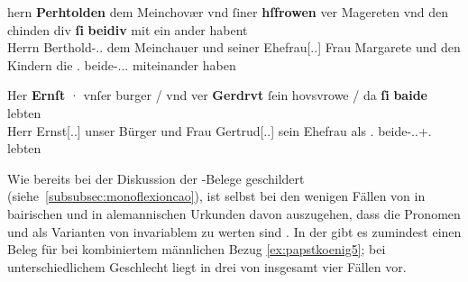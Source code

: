 \begin{exe}
\ex \label{ex:m+f_si_beide_iu}
	\begin{xlist}
	\ex \label{ex:m+f_si_beidiu}
		\gll hern \textbf{Perhtolden} dem Meinchovær vnd ſiner \textbf{hſfrowen} ver
				Magereten vnd den chinden div \textbf{ſi} \textbf{beidiv} {mit
				ein ander} habent \\
			Herrn Berthold-\Dat.\Sg.\MascM{} dem Meinchauer und seiner
				Ehefrau[\Dat.\Sg.\FemF] Frau Margarete und den Kindern die
				\Tpl\subMF.\Nom{} beide-\Nom.\Pl.\NeutMF.\St{} miteinander
				haben \\
		\begin{taggedline}{\parencites(Regensburg, 1287)[\pno~937, 292.40--41]{cao2}}
		\trans {}
		\end{taggedline}

	\ex \label{ex:m+f_si_beide}
		\gll Her \textbf{Ernſt} · vnſer burger / vnd ver \textbf{Gerdrvt} ſein
				hovsvrowe / da \textbf{ſi} \textbf{baide} lebten \\
			Herr Ernst[\Nom.\Sg.\MascM] {} unser Bürger {} und Frau
				Gertrud[\Nom.\Sg.\FemF] sein Ehefrau {} als \Tpl\subMF.\Nom{}
				beide-\Nom.\Pl.\M+\F\subMF.\St{} lebten \\
		\begin{taggedline}{\parencites(Wien, 1289)[\pno~1073, 374.40--41]{cao2}}
		\trans {}
		\end{taggedline}
	\end{xlist}
\end{exe}

Wie bereits bei der Diskussion der \CAO{}-Belege geschildert
(siehe~\cref{subsubsec:monoflexioncao}), ist selbst bei den wenigen Fällen von
 in bairischen und  in alemannischen Urkunden
davon auszugehen, dass die Pronomen  und  als Varianten von
invariablem  zu werten sind \autocite[vgl.][394--396]{ksw2}. In der
\citet{kc} gibt es zumindest einen Beleg für  bei kombiniertem
männlichen Bezug \cref{ex:papstkoenig5}; bei unterschiedlichem Geschlecht liegt
 in drei von insgesamt vier Fällen vor.

